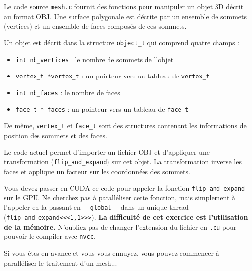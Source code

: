 \begin{wtodo}{}

Le code source {\tt mesh.c} fournit des fonctions pour manipuler un objet 3D décrit au format OBJ. Une surface polygonale est décrite par un ensemble de sommets (vertices) et un ensemble de faces composés de ces sommets.

Un objet est décrit dans la structure {\tt object\_t} qui comprend quatre champs :
\begin{itemize}
	\item {\tt int nb\_vertices} : le nombre de sommets de l'objet
	\item {\tt vertex\_t *vertex\_t} : un pointeur vers un tableau de {\tt vertex\_t}
	\item {\tt int nb\_faces} : le nombre de faces
	\item {\tt face\_t * faces} : un pointeur vers un tableau de {\tt face\_t}
\end{itemize}
De même, {\tt vertex\_t} et {\tt face\_t} sont des structures contenant les informations de position des sommets et des faces.

Le code actuel permet d'importer un fichier OBJ et d'appliquer une transformation ({\tt flip\_and\_expand}) sur cet objet. La transformation inverse les faces et applique un facteur sur les coordonnées des sommets.
\medskip

Vous devez passer en CUDA ce code pour appeler la fonction {\tt flip\_and\_expand} sur le GPU. Ne cherchez pas à paralléliser cette fonction, mais simplement à l'appeler en la passant en {\tt \_{}\_global\_{}\_} dans un unique thread ({\tt flip\_and\_expand<{}<{}<{}1,1{}>{}>{}>}). {\bf La difficulté de cet exercice est l'utilisation de la mémoire.} N'oubliez pas de changer l'extension du fichier en {\tt .cu} pour pouvoir le compiler avec {\tt nvcc}.
\medskip

Si vous êtes en avance et vous vous ennuyez, vous pouvez commencer à paralléliser le traitement d'un mesh...
\end{wtodo}



